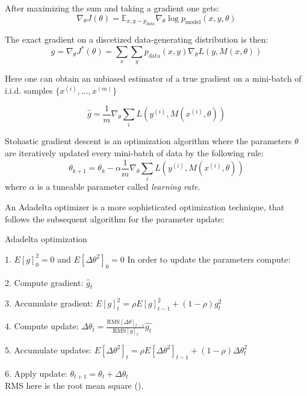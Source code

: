 After maximizing the sum and taking a gradient one gets:
\begin{equation}
	\nabla_{\theta} J(\theta) = \mathbb{E}_{x, y \sim p_{data}} \nabla_{\theta} \log{p_{\text{model}}(x, y, \theta)}
\end{equation}

The exact gradient on a discetized data-generating distribution is then:
\begin{equation}
	g = \nabla_{\theta} J^*(\theta) = \sum_{x} \sum_{y}{p_{\text{data}}(x, y) \nabla_{\theta} L(y, M(x, \theta))}
\end{equation}

Here one can obtain an unbiased estimator of a true gradient on a mini-batch of i.i.d. samples $\{x^{(i)}, ..., x^{(m)}\}$	

\begin{equation}
	\hat{g} = \frac{1}{m} \nabla_\theta \sum_{i} L(y^{(i)}, M(x^{(i)}, \theta))
\end{equation}

\begin{definition}
	Stohastic gradient descent is an optimization algorithm where the parameters $\theta$ are iteratively updated every mini-batch of data by the following rule:
	\begin{equation}
		\theta_{k+1} = \theta_k - \alpha \frac{1}{m} \nabla_\theta \sum_{i} L(y^{(i)}, M(x^{(i)}, \theta))
	\end{equation}
	where $\alpha$ is a tuneable parameter called \textit {learning rate}.
\end{definition}

\begin{definition}
	An Adadelta optimizer is a more sophisticated optimization technique, that follows the subsequent algorithm for the parameter update:
	\begin{algorithm}
		\caption{Adadelta optimization}\label{alg:adadelta}
		\item 1. $E[g]^2_0 = 0$ and $E[\Delta \theta^2]_0 = 0$
		In order to update the parameters compute:
		\item 2. Compute gradient: $\hat{g}_t$
		\item 3. Accumulate gradient: $E[g]^2_t = \rho E[g]^2_{t - 1} + (1 - \rho)g_t^2$
		\item 4. Compute update: $\Delta \theta_t = \frac{\text{RMS}[\Delta \theta]_{t-1}}{\text{RMS}[g]_t} \hat{g_t}$
		\item 5. Accumulate updates: $E[\Delta \theta^2]_t = \rho E[\Delta \theta^2]_{t-1} + (1 - \rho) \Delta \theta^2_t$
		\item 6. Apply update: $\theta_{t+1} = \theta_t + \Delta \theta_t$ \\
		RMS here is the root mean square (\cite{Zeiler_2012}).
	\end{algorithm}
\end{definition}

